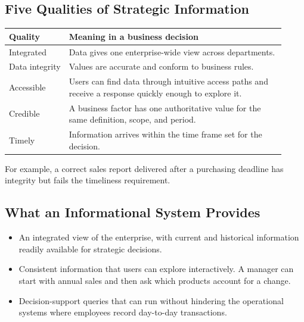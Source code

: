 \documentclass[12pt,a4paper]{article}
\newcommand{\rowgap}{\\[4pt]}
\begin{document}
\subsection{Five Qualities of Strategic Information}
\begin{center}\small
\begin{tabular}{@{}p{0.20\linewidth}p{0.72\linewidth}@{}}\hline
\textbf{Quality} & \textbf{Meaning in a business decision}\\ \hline
Integrated & Data gives one enterprise-wide view across departments.\rowgap
Data integrity & Values are accurate and conform to business rules.\rowgap
Accessible & Users can find data through intuitive access paths and receive a response quickly enough to explore it.\rowgap
Credible & A business factor has one authoritative value for the same definition, scope, and period.\rowgap
Timely & Information arrives within the time frame set for the decision.\\ \hline
\end{tabular}
\end{center}
For example, a correct sales report delivered after a purchasing deadline has integrity but fails the timeliness requirement.

\subsection{What an Informational System Provides}
\begin{itemize}
\item An integrated view of the enterprise, with current and historical information readily available for strategic decisions.
\item Consistent information that users can explore interactively. A manager can start with annual sales and then ask which products account for a change.
\item Decision-support queries that can run without hindering the operational systems where employees record day-to-day transactions.
\end{itemize}
\end{document}
